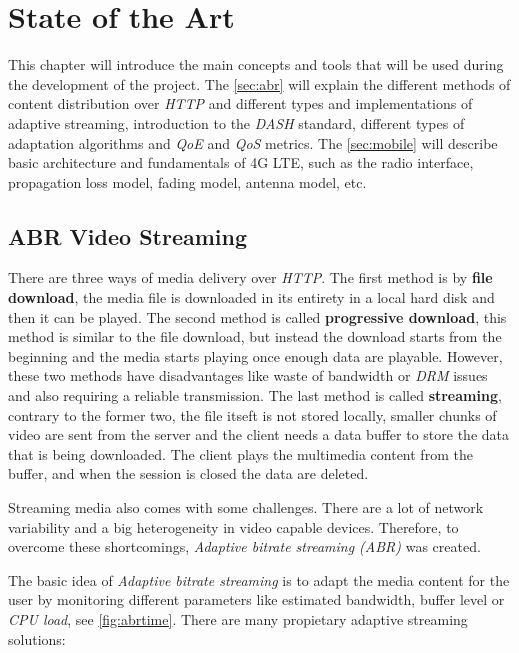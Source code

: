 \chapter{State of the Art}
\label{chap:soa}

This chapter will introduce the main concepts and tools that will be used during the development 
of the project. The \autoref{sec:abr} will explain the different methods of content distribution 
over \textit{HTTP} and different types and implementations of adaptive streaming, introduction to 
the \textit{DASH} standard, different types of adaptation algorithms and \textit{QoE} and 
\textit{QoS} metrics. The \autoref{sec:mobile} will describe basic architecture and fundamentals
of 4G LTE, such as the radio interface, propagation loss model, fading model, antenna model, etc.

\section{ABR Video Streaming}
\label{sec:abr}

There are three ways of media delivery over \textit{HTTP}. The first method is by
\textbf{file download}, the media file is downloaded in its entirety in a local hard disk and 
then it can be played. The second method is called \textbf{progressive download}, this method
is similar to the file download, but instead the download starts from the beginning and the 
media starts playing once enough data are playable. 
However, these two methods have disadvantages like waste of bandwidth or
\textit{DRM} issues and also requiring a reliable transmission. The last method is called
\textbf{streaming}, contrary to the former two, the file itseft is not stored locally, 
smaller chunks of video are sent from the server and the client needs a data buffer to store 
the data that is being downloaded. The client plays the multimedia content from the 
buffer, and when the session is closed the data are deleted.

Streaming media also comes with some challenges. There are a lot of network variability
and a big heterogeneity in video capable devices. Therefore, to overcome these shortcomings,
\textit{Adaptive bitrate streaming (ABR)} was created.

The basic idea of \textit{Adaptive bitrate streaming} is to adapt the media content
for the user by monitoring different parameters like estimated bandwidth, buffer level or
\textit{CPU load}, see \autoref{fig:abrtime}. There are many propietary adaptive streaming solutions:

